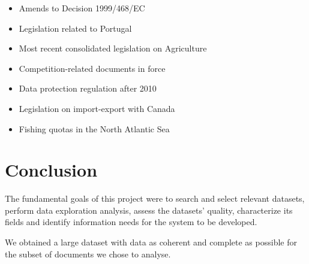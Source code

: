 \documentclass[sigconf, authorversion]{acmart}
\let\mainabsdir\theabsdir %
\begin{document}
\begin{itemize}
    \item Amends to Decision 1999/468/EC
    \item Legislation related to Portugal
    \item Most recent consolidated legislation on Agriculture
    \item Competition-related documents in force
    \item Data protection regulation after 2010
    \item Legislation on import-export with Canada
    \item Fishing quotas in the North Atlantic Sea
\end{itemize}

\section{Conclusion}

The fundamental goals of this project were to search and select relevant datasets, perform data exploration analysis, assess the datasets' quality, characterize its fields and identify information needs for the system to be developed.

We obtained a large dataset with data as coherent and complete as possible for the subset of documents we chose to analyse.



\end{document}

